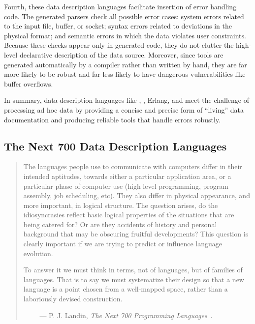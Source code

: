 Fourth, these data description languages 
facilitate insertion of error handling code. 
The generated parsers check all possible
error cases: system errors related to the input file, buffer, or
socket; syntax errors related to deviations in the physical format;
and semantic errors in which the data violates user
constraints. Because these checks appear only in generated code, they
do not clutter the high-level declarative description of the data
source. Moreover, since tools are generated automatically by a
compiler rather than written by hand, they are far more likely to be
robust and far less likely to have dangerous vulnerabilities like
buffer overflows. 

In summary, data description languages like \datascript{},
\packettypes{}, Erlang, and \pads{} meet the challenge of
processing ad hoc data by providing a concise and precise form of
``living'' data documentation and producing reliable tools that handle
errors robustly.


\subsection{The Next 700 Data Description Languages}

\begin {quote}
The languages people use to communicate with computers differ in their intended aptitudes, towards either a
particular application area, or a particular phase of computer use (high level programming, program assembly,
job scheduling, etc). They also differ in physical appearance, and more important, in logical structure. The question arises, do the idiosyncrasies reflect basic logical
properties of the situations that are being catered for?
Or are they accidents of history and personal background
that may be obscuring fruitful developments? This
question is clearly important if we are trying to predict or
influence language evolution.

To answer it we must think in terms, not of languages,
but of families of languages. That is to say we must
systematize their design so that a new language is a point
chosen from a well-mapped space, rather than a laboriously
devised construction.

$\qquad$ --- P. J. Landin, {\em The Next 700 Programming Languages}~\cite{landin:700}.
\end{quote}



